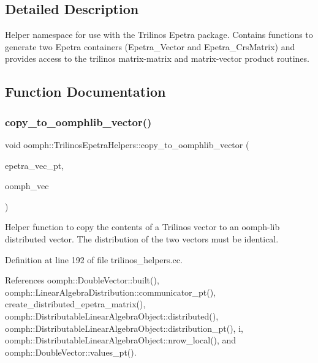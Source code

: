\subsection{Detailed Description}
Helper namespace for use with the Trilinos Epetra package. Contains functions to generate two Epetra containers (Epetra\+\_\+\+Vector and Epetra\+\_\+\+Crs\+Matrix) and provides access to the trilinos matrix-\/matrix and matrix-\/vector product routines. 

\subsection{Function Documentation}
\mbox{\label{namespaceoomph_1_1TrilinosEpetraHelpers_a302ed5d22db12175522a3fcf304856c9}} 
\subsubsection{\texorpdfstring{copy\+\_\+to\+\_\+oomphlib\+\_\+vector()}{copy\_to\_oomphlib\_vector()}}
{\footnotesize\ttfamily void oomph\+::\+Trilinos\+Epetra\+Helpers\+::copy\+\_\+to\+\_\+oomphlib\+\_\+vector (\begin{DoxyParamCaption}\item[{const Epetra\+\_\+\+Vector $\ast$}]{epetra\+\_\+vec\+\_\+pt,  }\item[{\hyperlink{classoomph_1_1DoubleVector}{Double\+Vector} \&}]{oomph\+\_\+vec }\end{DoxyParamCaption})}



Helper function to copy the contents of a Trilinos vector to an oomph-\/lib distributed vector. The distribution of the two vectors must be identical. 



Definition at line 192 of file trilinos\+\_\+helpers.\+cc.



References oomph\+::\+Double\+Vector\+::built(), oomph\+::\+Linear\+Algebra\+Distribution\+::communicator\+\_\+pt(), create\+\_\+distributed\+\_\+epetra\+\_\+matrix(), oomph\+::\+Distributable\+Linear\+Algebra\+Object\+::distributed(), oomph\+::\+Distributable\+Linear\+Algebra\+Object\+::distribution\+\_\+pt(), i, oomph\+::\+Distributable\+Linear\+Algebra\+Object\+::nrow\+\_\+local(), and oomph\+::\+Double\+Vector\+::values\+\_\+pt().



